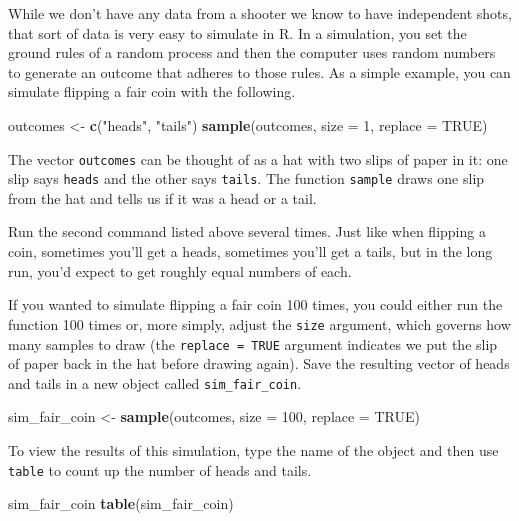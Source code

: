 \documentclass[]{book}
\newenvironment{Shaded}{\begin{snugshade}}{\end{snugshade}}
\newcommand{\KeywordTok}[1]{\textcolor[rgb]{0.13,0.29,0.53}{\textbf{{#1}}}}
\newcommand{\DataTypeTok}[1]{\textcolor[rgb]{0.13,0.29,0.53}{{#1}}}
\newcommand{\DecValTok}[1]{\textcolor[rgb]{0.00,0.00,0.81}{{#1}}}
\newcommand{\StringTok}[1]{\textcolor[rgb]{0.31,0.60,0.02}{{#1}}}
\newcommand{\OtherTok}[1]{\textcolor[rgb]{0.56,0.35,0.01}{{#1}}}
\newcommand{\NormalTok}[1]{{#1}}
\theoremstyle{definition}
\theoremstyle{definition}
\theoremstyle{remark}
\begin{document}
While we don't have any data from a shooter we know to have independent
shots, that sort of data is very easy to simulate in R. In a simulation,
you set the ground rules of a random process and then the computer uses
random numbers to generate an outcome that adheres to those rules. As a
simple example, you can simulate flipping a fair coin with the
following.

\begin{Shaded}
\begin{Highlighting}[]
\NormalTok{outcomes <-}\StringTok{ }\KeywordTok{c}\NormalTok{(}\StringTok{"heads"}\NormalTok{, }\StringTok{"tails"}\NormalTok{)}
\KeywordTok{sample}\NormalTok{(outcomes, }\DataTypeTok{size =} \DecValTok{1}\NormalTok{, }\DataTypeTok{replace =} \OtherTok{TRUE}\NormalTok{)}
\end{Highlighting}
\end{Shaded}

The vector \texttt{outcomes} can be thought of as a hat with two slips
of paper in it: one slip says \texttt{heads} and the other says
\texttt{tails}. The function \texttt{sample} draws one slip from the hat
and tells us if it was a head or a tail.

Run the second command listed above several times. Just like when
flipping a coin, sometimes you'll get a heads, sometimes you'll get a
tails, but in the long run, you'd expect to get roughly equal numbers of
each.

If you wanted to simulate flipping a fair coin 100 times, you could
either run the function 100 times or, more simply, adjust the
\texttt{size} argument, which governs how many samples to draw (the
\texttt{replace\ =\ TRUE} argument indicates we put the slip of paper
back in the hat before drawing again). Save the resulting vector of
heads and tails in a new object called \texttt{sim\_fair\_coin}.

\begin{Shaded}
\begin{Highlighting}[]
\NormalTok{sim_fair_coin <-}\StringTok{ }\KeywordTok{sample}\NormalTok{(outcomes, }\DataTypeTok{size =} \DecValTok{100}\NormalTok{, }\DataTypeTok{replace =} \OtherTok{TRUE}\NormalTok{)}
\end{Highlighting}
\end{Shaded}

To view the results of this simulation, type the name of the object and
then use \texttt{table} to count up the number of heads and tails.

\begin{Shaded}
\begin{Highlighting}[]
\NormalTok{sim_fair_coin}
\KeywordTok{table}\NormalTok{(sim_fair_coin)}
\end{Highlighting}
\end{Shaded}
\end{document}
